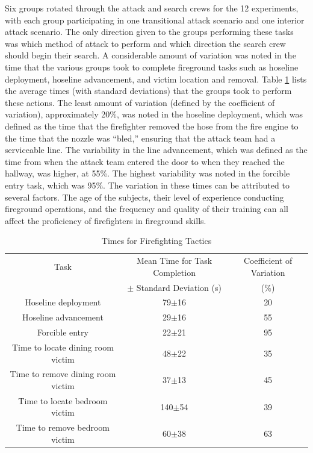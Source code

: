 \documentclass[12pt,oneside]{article}
\begin{document}
 Six groups rotated through the attack and search crews for the 12 experiments, with each group participating in one transitional attack scenario and one interior attack scenario. The only direction given to the groups performing these tasks was which method of attack to perform and which direction the search crew should begin their search. A considerable amount of variation was noted in the time that the various groups took to complete fireground tasks such as hoseline deployment, hoseline advancement, and victim location and removal. Table \ref{tab:ff_tasks} lists the average times (with standard deviations) that the groups took to perform these actions. The least amount of variation (defined by the coefficient of variation), approximately 20\%, was noted in the hoseline deployment, which was defined as the time that the firefighter removed the hose from the fire engine to the time that the nozzle was ``bled,'' ensuring that the attack team had a serviceable line. The variability in the line advancement, which was defined as the time from when the attack team entered the door to when they reached the hallway, was higher, at 55\%. The highest variability was noted in the forcible entry task, which was  95\%. The variation in these times can be attributed to several factors. The age of the subjects, their level of experience conducting fireground operations, and the frequency and quality of their training can all affect the proficiency of firefighters in fireground skills. 

\begin{table}[!ht]
    \centering
    \caption{Times for Firefighting Tactics}
    \label{tab:ff_tasks}
    \begin{tabular}{ccc}
    \toprule[1.5pt]
 	Task&								Mean Time for Task Completion  	& Coefficient of Variation\\
 		&								$\pm$ Standard Deviation (s)	&	(\%)		\\
 	\midrule 
  	Hoseline deployment					&	79$\pm$16					&	20\\
  	Hoseline advancement				&	29$\pm$16					&	55\\
  	Forcible entry						&	22$\pm$21					&	95\\
  	Time to locate dining room victim 	&	48$\pm$22					&	35\\
  	Time to remove dining room victim 	&	37$\pm$13					&	45\\
  	Time to locate bedroom victim 		&	140$\pm$54					&	39\\
  	Time to remove bedroom victim 		&	60$\pm$38					&	63\\  	
 	\bottomrule[1.25pt] 
    \end{tabular}
\end{table}
\end{document}
